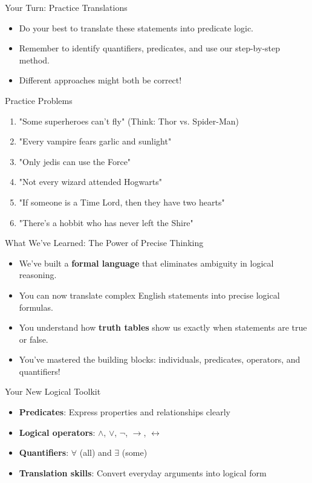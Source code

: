 \documentclass{beamer}
\begin{document}
	\begin{frame}{Your Turn: Practice Translations }
		\begin{itemize}
			\item Do your best to translate these statements into predicate logic.
			\item Remember to identify quantifiers, predicates, and use our step-by-step method.
			\item Different approaches might both be correct!
		\end{itemize}
		
		\begin{block}{Practice Problems}
			\begin{enumerate}
				\item "Some superheroes can't fly" (Think: Thor vs. Spider-Man)
				\item "Every vampire fears garlic and sunlight"
				\item "Only jedis can use the Force"
				\item "Not every wizard attended Hogwarts"
				\item "If someone is a Time Lord, then they have two hearts"
				\item "There's a hobbit who has never left the Shire"
			\end{enumerate}
		\end{block}
	\end{frame}
	
	\begin{frame}{What We've Learned: The Power of Precise Thinking}
		\begin{itemize}
			\item We've built a \textbf{formal language} that eliminates ambiguity in logical reasoning.
			\item You can now translate complex English statements into precise logical formulas.
			\item You understand how \textbf{truth tables} show us exactly when statements are true or false.
			\item You've mastered the building blocks: individuals, predicates, operators, and quantifiers!
		\end{itemize}
		
		\begin{block}{Your New Logical Toolkit}
			\begin{itemize}
				\item \textbf{Predicates}: Express properties and relationships clearly
				\item \textbf{Logical operators}: $\land$, $\lor$, $\neg$, $\rightarrow$, $\leftrightarrow$
				\item \textbf{Quantifiers}: $\forall$ (all) and $\exists$ (some)
				\item \textbf{Translation skills}: Convert everyday arguments into logical form
			\end{itemize}
		\end{block}
	\end{frame}
	
\end{document}
